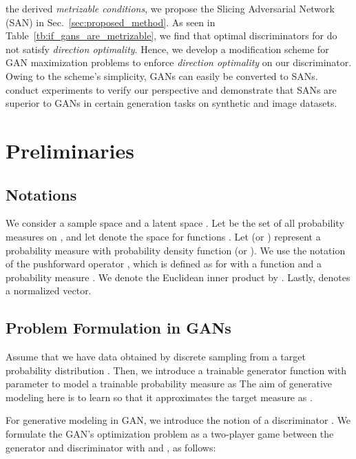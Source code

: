  the derived \textit{metrizable conditions}, we propose the Slicing Adversarial Network (SAN) in Sec.~\ref{sec:proposed_method}. As seen in Table~\ref{tb:if_gans_are_metrizable}, we find that optimal discriminators for  do not satisfy \textit{direction optimality}. Hence, we develop a modification scheme for GAN maximization problems to enforce \textit{direction optimality} on our discriminator. Owing to the scheme's simplicity, GANs can easily be converted to SANs.
 conduct experiments to verify our perspective and demonstrate that SANs are superior to GANs in certain generation tasks on synthetic and image datasets.





\section{Preliminaries}
\label{sec:background}

\subsection{Notations}
We consider a sample space  and a latent space . Let  be the set of all probability measures on , and let  denote the  space for functions .
Let  (or ) represent a probability measure with probability density function  (or ).
We use the notation of the pushforward operator , which is defined as  for  with a function  and a probability measure .
We denote the Euclidean inner product by .
Lastly,  denotes a normalized vector.


\subsection{Problem Formulation in GANs}
\label{ssec:problem_formulation}

Assume that we have data obtained by discrete sampling from a target probability distribution .
Then, we introduce a trainable generator function  with parameter  to model a trainable probability measure as 
The aim of generative modeling here is to learn  so that it approximates the target measure as .
 
For generative modeling in GAN, we introduce the notion of a discriminator .
We formulate the GAN's optimization problem as a two-player game between the generator and discriminator with \yuhtb{} and , as follows:

